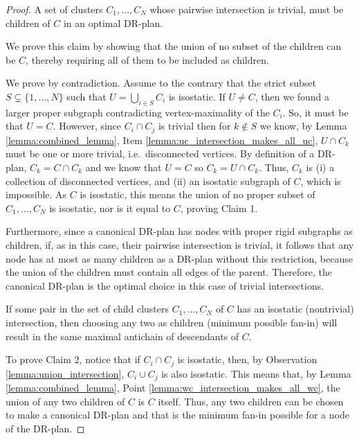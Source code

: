 \begin{proof}
\medskip\noindent
{}
%
A set of clusters $C_1,\ldots,C_N$ whose pairwise intersection is trivial, must be children of $C$ in an optimal DR-plan.

We prove this claim  by showing that the union of no subset of the children can be $C$, thereby requiring all of them to be included as children.



We prove by contradiction.
Assume to the contrary that the strict subset $S\subsetneq \{1,\ldots,N\}$ such that $U=\bigcup_{i\in S}{C_i}$ is isostatic. If $U\neq C$, then we found a larger proper subgraph contradicting vertex-maximality of the $C_i$. So, it must be that $U=C$.
\usestwod
However, since $C_i \cap C_j$ is trivial then for $k\notin S$ we know, by Lemma \ref{lemma:combined_lemma}, Item \ref{lemma:uc_intersection_makes_all_uc}, $U\cap C_k$ must be one or more trivial, i.e.\ disconnected vertices. By definition of a DR-plan, $C_k=C\cap C_k$ and we know that $U=C$ so $C_k=U\cap C_k$. Thus, $C_k$ is (i) a collection of disconnected vertices, and (ii) an isostatic subgraph of $C$, which is impossible. As $C$ is isostatic, this means the union of no proper subset of $C_1,\ldots,C_N$ is isostatic, nor is it equal to $C$, proving Claim 1.

Furthermore, since a canonical DR-plan has nodes with proper rigid  subgraphs as children, if, as in this case, their pairwise intersection is trivial, it follows that any node has at most as many children as a DR-plan without this restriction, because the union of the children must contain all edges of the parent. Therefore, the canonical DR-plan is the optimal choice in this case of trivial intersections.

\medskip\noindent
{}
If some pair in the set of child clusters $C_1,\ldots,C_N$ of $C$ has an isostatic (nontrivial) intersection, then choosing any two as children (minimum possible fan-in) will result in the same maximal antichain of descendants of $C$.

To prove Claim 2, notice that if  $C_i \cap C_j$ is isostatic, then, by Observation \ref{lemma:union_intersection}, $C_i \cup C_j$ is also isostatic. This means that, by Lemma \ref{lemma:combined_lemma}, Point \ref{lemma:wc_intersection_makes_all_wc}, the union of any two children of $C$ is $C$ itself. Thus, any two children can be chosen to make a canonical DR-plan and that is the minimum fan-in possible for a node of the DR-plan.


\end{proof}
